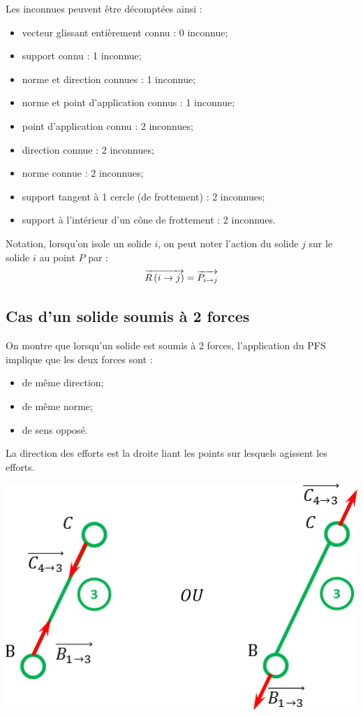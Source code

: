 \documentclass[11pt,oneside]{article}
\begin{document}
Les inconnues peuvent être décomptées ainsi :
\begin{itemize}
\item vecteur glissant entièrement connu : 0 inconnue;
\item support connu : 1 inconnue;
\item norme et direction connues : 1 inconnue;
\item norme et point d'application connus : 1 inconnue;
\item point d'application connu : 2 inconnues;
\item direction connue : 2 inconnues;
\item norme connue : 2 inconnues;
\item support tangent à 1 cercle (de frottement) : 2 inconnues;
\item support à l'intérieur d’un cône de frottement : 2 inconnues.
\end{itemize}

\begin{rem}
Notation, lorsqu'on isole un solide $i$, on peut noter l'action du solide $j$ sur le solide $i$ au point $P$ par : 
$$
\overrightarrow{R\left( {i} \rightarrow {j}\right)}=\overrightarrow{P_{i\rightarrow j}}
$$
\end{rem}
\subsection{Cas d'un solide soumis à 2 forces}
\begin{minipage}[c]{.55\linewidth}
\begin{resultat}
On montre que lorsqu'un solide est soumis à 2 forces, l'application du PFS implique que les deux forces sont : 
\begin{itemize}
\item de même direction;
\item de même norme;
\item de sens opposé.
\end{itemize}

La direction des efforts est la droite liant les points sur lesquels agissent les efforts.
\end{resultat}
\end{minipage}\hfill
\begin{minipage}[c]{.4\linewidth}
\begin{center}
\includegraphics[width=.95\textwidth]{png/3F}
\end{center}
\end{minipage}
\end{document}
